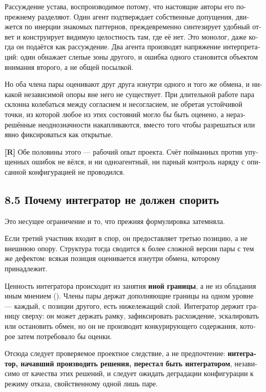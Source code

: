 \begin{russian}
Рассуждение устава, воспроизводимое потому, что настоящие авторы его по-прежнему разделяют. Один агент подтверждает собственные допущения, движется по инерции знакомых паттернов, преждевременно синтезирует удобный ответ и конструирует видимую целостность там, где её нет. Это монолог, даже когда он подаётся как рассуждение. Два агента производят напряжение интерпретаций: один обнажает слепые зоны другого, и ошибка одного становится объектом внимания второго, а не общей посылкой.

Но оба члена пары оценивают друг друга изнутри одного и того же обмена, и никакой независимой опоры вне него не существует. При длительной работе пара склонна колебаться между согласием и несогласием, не обретая устойчивой точки, из которой любое из этих состояний могло бы быть оценено, а неразрешённые неоднозначности накапливаются, вместо того чтобы разрешаться или явно фиксироваться как открытые.

\textbf{[R]} Обе половины этого — рабочий опыт проекта. Счёт пойманных против упущенных ошибок не вёлся, и ни одноагентный, ни парный контроль наряду с описанной конфигурацией не проводился.


\subsection*{8.5 Почему интегратор не должен спорить}
\label{sec:ru:8.5}

Это несущее ограничение и то, что прежняя формулировка затемняла.

Если третий участник входит в спор, он предоставляет третью позицию, а не внешнюю опору. Структура тогда сводится к более сложной версии пары с тем же дефектом: всякая позиция оценивается изнутри обмена, которому принадлежит.

Ценность интегратора происходит из занятия \textbf{иной границы}, а не из обладания иным мнением (). Члены пары держат дополняющие границы на одном уровне — каждый, с позиции другого, есть нижележащий слой. Интегратор держит границу сверху: он может держать рамку, зафиксировать расхождение, эскалировать или остановить обмен, но он не производит конкурирующего содержания, которое затем потребовало бы оценки.

Отсюда следует проверяемое проектное следствие, а не предпочтение: \textbf{интегратор, начавший производить решения, перестал быть интегратором}, независимо от качества этих решений, и следует ожидать деградации конфигурации к режиму отказа, свойственному одной лишь паре.



\end{russian}
